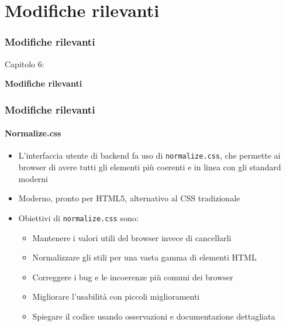 %

\section{Modifiche rilevanti}
\begin{frame}[fragile]
	\frametitle{Modifiche rilevanti}

	\begin{center}\huge{Capitolo 6:}\end{center}
	\begin{center}\huge{\color{typo3darkgrey}\textbf{Modifiche rilevanti}}\end{center}

\end{frame}


\begin{frame}[fragile]
	\frametitle{Modifiche rilevanti}
	\framesubtitle{Normalize.css}

	\begin{itemize}
		\item L'interfaccia utente di backend fa uso di \texttt{normalize.css},\newline
			che permette ai browser di avere tutti gli elementi più coerenti e in linea con gli standard moderni
		\item Moderno, pronto per HTML5, alternativo al CSS tradizionale
		\item Obiettivi di \texttt{normalize.css} sono:

			\begin{itemize}
				\item Mantenere i valori utili del browser invece di cancellarli
				\item Normalizzare gli stili per una vasta gamma di elementi HTML
				\item Correggere i bug e le incoerenze più comuni dei browser
				\item Migliorare l'usabilità con piccoli miglioramenti
				\item Spiegare il codice usando osservazioni e documentazione dettagliata
			\end{itemize}

	\end{itemize}

\end{frame}

